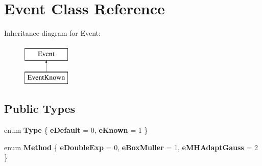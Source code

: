 \hypertarget{class_event}{\section{Event Class Reference}
\label{class_event}
}
Inheritance diagram for Event\-:\begin{figure}[H]
\begin{center}
\leavevmode
\includegraphics[height=2.000000cm]{class_event}
\end{center}
\end{figure}
\subsection*{Public Types}
\begin{DoxyCompactItemize}
\item 
enum {\bfseries Type} \{ {\bfseries e\-Default} = 0, 
{\bfseries e\-Known} = 1
 \}
\item 
enum {\bfseries Method} \{ {\bfseries e\-Double\-Exp} = 0, 
{\bfseries e\-Box\-Muller} = 1, 
{\bfseries e\-M\-H\-Adapt\-Gauss} = 2
 \}
\end{DoxyCompactItemize}
